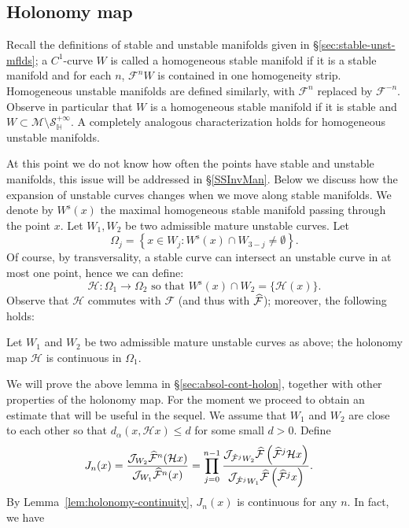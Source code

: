 \documentclass[AHL, Unicode, longabstracts,published]{cedram}
\newcommand{\stable}{\text{s}}
\newcommand{\homo}{\mathbb{H}}
\newcommand{\cm}{\mathcal{F}}
\newcommand{\hol}{\mathcal{H}}
\newcommand{\csp}{\mathcal{M}}
\newcommand{\cmp}{\hat\cm}
\newcommand{\Ws}{W^{\stable}}
\newcommand{\singPrivate}{\mathcal{S}}
\newcommand{\hsing}[1]{{\singPrivate}_\homo^{#1}}
\newcommand{\jac}[1]{\mathcal{J}_{#1}}
\let\oldhat\hat
\renewcommand*{\hat}[1]{\mathchoice{\widehat{#1}}{\widehat{#1}}{\oldhat{#1}}{\oldhat{#1}}}
\begin{document}
\subsection{Holonomy map}\label{SSHolonomy}
Recall the definitions of stable and unstable manifolds given in \S\ref{sec:stable-unst-mflds}; a $C^1$-curve $W$ is called a homogeneous stable manifold if it is a stable manifold and for each $n$, $\cm^n W$ is contained in one homogeneity strip. Homogeneous unstable manifolds are defined similarly, with $\cm^{n}$ replaced by $\cm^{-n}$. Observe in particular that $W$ is a homogeneous stable manifold if it is stable and $W\subset \csp\setminus\hsing{+\infty}$. A completely analogous characterization holds for homogeneous unstable manifolds.

At this point we do not know how often the points have stable and unstable manifolds, this issue will be addressed in
\S\ref{SSInvMan}. Below we discuss how the expansion of unstable curves changes when we move along stable manifolds. We denote by $\Ws(x)$ the maximal homogeneous stable manifold passing through the point $x$. Let $W_1, W_2$ be two admissible mature unstable curves. Let
\begin{equation}\label{DomainRangeHol}
\Omega_j =\left\{x\in W_j: \Ws(x)\cap W_{3-j}\neq \emptyset\right\}.
\end{equation}
Of course, by transversality, a stable curve can intersect an unstable curve in at most one point, hence we can define:
\begin{equation}\label{DefHolonomy}
\hol:\Omega_1\to\Omega_2 \text{ so that } \Ws(x)\cap W_2 = \{\hol(x)\}.
\end{equation}
Observe that $\hol$ commutes with $\cm$ (and thus with $\cmp$); moreover, the following holds:


\begin{lemm}\label{lem:holonomy-continuity}
Let $W_{1}$ and $W_{2}$ be two admissible mature unstable curves as above; the holonomy map $\hol$ is continuous in $\Omega_{1}$.
\end{lemm} We will prove the above lemma in \S\ref{sec:absol-cont-holon}, together with other properties of the holonomy map. For the moment we proceed to obtain an estimate that will be useful in the sequel. We assume that $W_1$ and $W_2$ are close to each other so that $d_\alpha(x, \hol x)\leq d$ for some small $d > 0$. Define
\begin{align}\label{Jak}
J_n(x)& = \frac{\jac{W_{2}}\cmp^{n}(\hol x)}{\jac{W_{1}}\cmp^{n}(x)} = \prod_{j=0}^{n-1} \frac{\jac{\cmp^{j}W_{2}}\cmp\left(\cmp^j \hol x\right)}{\jac{\cmp^{j}W_{1}}\cmp\left(\cmp^j x\right)}.
\end{align}
By Lemma~\ref{lem:holonomy-continuity}, $J_{n}(x)$ is continuous for any $n$. In fact, we have
\end{document}
